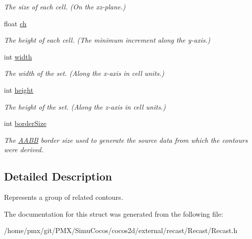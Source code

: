 \begin{DoxyCompactItemize}
\begin{DoxyCompactList}\small\item\em The size of each cell. (On the xz-\/plane.) \end{DoxyCompactList}\item 
\mbox{\label{structrcContourSet_ada4d5c2916f351065c6f5a382f087ebc}} 
float \hyperlink{structrcContourSet_ada4d5c2916f351065c6f5a382f087ebc}{ch}
\begin{DoxyCompactList}\small\item\em The height of each cell. (The minimum increment along the y-\/axis.) \end{DoxyCompactList}\item 
\mbox{\label{structrcContourSet_af165415f9e2ef3cf446786040864e6d2}} 
int \hyperlink{structrcContourSet_af165415f9e2ef3cf446786040864e6d2}{width}
\begin{DoxyCompactList}\small\item\em The width of the set. (Along the x-\/axis in cell units.) \end{DoxyCompactList}\item 
\mbox{\label{structrcContourSet_a18be0e9d84b65e8688153b0adb517124}} 
int \hyperlink{structrcContourSet_a18be0e9d84b65e8688153b0adb517124}{height}
\begin{DoxyCompactList}\small\item\em The height of the set. (Along the z-\/axis in cell units.) \end{DoxyCompactList}\item 
\mbox{\label{structrcContourSet_adb04d1277e815ed89b156714bad3c17a}} 
int \hyperlink{structrcContourSet_adb04d1277e815ed89b156714bad3c17a}{border\+Size}
\begin{DoxyCompactList}\small\item\em The \hyperlink{classAABB}{A\+A\+BB} border size used to generate the source data from which the contours were derived. \end{DoxyCompactList}\end{DoxyCompactItemize}


\subsection{Detailed Description}
Represents a group of related contours. 

The documentation for this struct was generated from the following file\+:\begin{DoxyCompactItemize}
\item 
/home/pmx/git/\+P\+M\+X/\+Simu\+Cocos/cocos2d/external/recast/\+Recast/Recast.\+h\end{DoxyCompactItemize}
